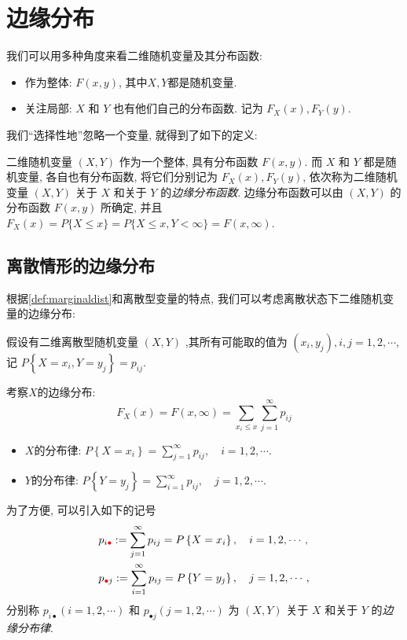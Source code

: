 \section{边缘分布}

我们可以用多种角度来看二维随机变量及其分布函数: 
\begin{itemize}
  \item 作为整体: $F(x, y)$, 其中$X,Y$都是随机变量.
  \item 关注局部: $X$ 和 $Y$ 也有他们自己的分布函数. 记为 $F_X(x), F_Y(y)$.
\end{itemize}

我们``选择性地''忽略一个变量, 就得到了如下的定义:
\begin{definition}[边缘分布]
  \label{def:marginaldist}
  二维随机变量 $(X, Y)$ 作为一个整体, 具有分布函数 $F(x, y)$. 而 $X$ 和 $Y$ 都是随机变量, 各自也有分布函数, 将它们分别记为 $F_X(x), F_Y(y)$, 依次称为二维随机变量 $(X, Y)$ 关于 $X$ 和关于 $Y$ 的\emph{边缘分布函数}. 边缘分布函数可以由 $(X, Y)$ 的分布函数 $F(x, y)$ 所确定, 并且$F_X(x)=P\{X \leqslant x\}=P\{X \leqslant x, Y<\infty\}=F(x, \infty)$.
\end{definition}

\subsection{离散情形的边缘分布}
根据\cref{def:marginaldist}和离散型变量的特点, 我们可以考虑离散状态下二维随机变量的边缘分布: 

假设有二维离散型随机变量 $(X, Y)$ ,其所有可能取的值为 $\left(x_i, y_j\right), i, j=1,2, \cdots$, 记 $P\left\{X=x_i, Y=y_j\right\}=p_{i j}$. 
\begin{definition*}
  考察$X$的边缘分布:
  $$
        F_X(x)=F(x, \infty)=\sum_{x_i \leqslant x} \sum_{j=1}^{\infty} p_{i j}
    $$

    \begin{itemize}
        \item $X$的分布律: $P\left\{X=x_i\right\}=\sum_{j=1}^{\infty} p_{i j}, \quad i=1,2, \cdots .$
        \item $Y$的分布律: $P\left\{Y=y_j\right\}=\sum_{i=1}^{\infty} p_{i j}, \quad j=1,2, \cdots .$
    \end{itemize}

    为了方便, 可以引入如下的记号
    $$
        \begin{aligned}
             & p_{i {{\color{red}\bullet}}}:=\sum_{j=1}^{\infty} p_{i j}=P\left\{X=x_i\right\}, \quad i=1,2, \cdots,   \\
             & p_{{{{\color{red}\bullet}}} j}:=\sum_{i=1}^{\infty} p_{i j}=P\left\{Y=y_j\right\}, \quad j=1,2, \cdots,
        \end{aligned}
    $$
    分别称 $p_{i \bullet} (i=1,2, \cdots)$ 和 $p_{\bullet j}(j=1,2, \cdots)$ 为 $(X, Y)$ 关于 $X$ 和关于 $Y$ 的\emph{边缘分布律}.
\end{definition*}
    
